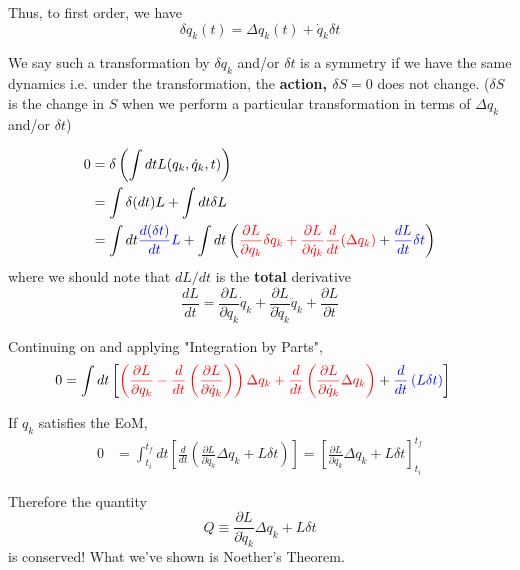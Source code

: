 \documentclass[11pt]{article}
\begin{document}
\vskip 0.5cm
Thus, to first order, we have 
\[ \boxed{\delta q_{k}(t) = \Delta q_{k}(t) + \dot{q}_{k} \delta t} \]

\vskip 0.5cm
\begin{bluebox}
We say such a transformation by $\delta q_{k}$ and/or $\delta t$ is a symmetry if we have the same dynamics i.e. under the transformation, the \textbf{action, $\delta S = 0$} does not change.  ($\delta S$ is the change in $S$ when we perform a particular transformation in terms of $\Delta q_{k}$ and/or $\delta t$)
\end{bluebox}

\vskip 0.5cm
\begin{align*}
  0 &= \delta \left( \int dt L(q_{k}, \dot{q}_k, t)\right) \\
  &= \int \delta(dt) L + \int dt \delta L \\
  &= \int dt \color{blue}\frac{d(\delta t)}{dt} L \color{black} + \int dt \left( \color{red} \frac{\partial L}{\partial q_{k}} \delta q_{k} + \frac{\partial L}{\partial \dot{q}_{k}} \frac{d}{dt}( \Delta q_{k} ) \color{black} + \color{blue} \frac{dL}{dt} \delta t \color{black} \right)
\end{align*}
\vskip 0.5cm
where we should note that $dL/dt$ is the \textbf{total} derivative
\[ \frac{dL}{dt} = \frac{\partial L}{\partial q_{k}} \dot{q}_k  + \frac{\partial L}{\partial \dot{q}_{k}} \ddot{q}_k + \frac{\partial L}{\partial t} \]

\vskip 0.5cm
Continuing on and applying "Integration by Parts",
\begin{align*}
  0 &= \int dt \left[ \color{red} \left( \frac{\partial L}{\partial q_{k}} - \frac{d}{dt} \left( \frac{\partial L}{\partial \dot{q}_k} \right) \right) \Delta q_{k} + \frac{d}{dt} \left( \frac{\partial L}{\partial \dot{q}_{k}} \Delta q_{k} \right) \color{black} + \color{blue}\frac{d}{dt} \left( L \delta t \right) \color{black} \right]
\end{align*}

\vskip 0.5cm
If $q_k$ satisfies the EoM,
\begin{align*}
  0 &= \int_{t_i}^{t_f} dt \left[ \frac{d}{dt} \left( \frac{\partial L}{\partial \dot{q}_{k}} \Delta q_{k} + L \delta t\right) \right] = \left[ \frac{\partial L}{\partial \dot{q}_k} \Delta q_{k} + L \delta t \right]_{t_i}^{t_f}
\end{align*}

Therefore the quantity
\[ Q \equiv \frac{\partial L}{\partial \dot{q}_k} \Delta q_{k} + L \delta t  \]
is conserved! What we've shown is Noether's Theorem.
\end{document}
